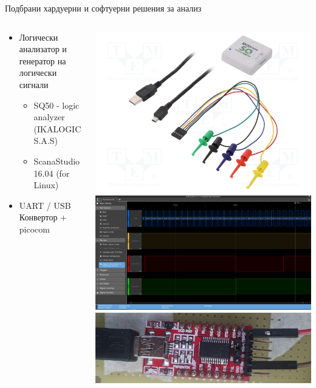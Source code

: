\documentclass{beamer}
\begin{document}
\begin{frame}{Подбрани хардуерни и софтуерни решения за анализ}
	\begin{columns}
		\pause
		\begin{block}{ }
			\begin{itemize}
				\pause
				\item Логически анализатор и генератор на логически сигнали
					\begin{itemize}
						\pause
						\item SQ50 - logic analyzer (IKALOGIC S.A.S)
						\pause
						\item ScanaStudio 16.04 (for Linux)
					\end{itemize}
				\pause
				\item UART / USB Конвертор + picocom
			\end{itemize}
		\end{block}
		\pause
		\includegraphics[width=0.8\linewidth]{Images/SQ50-logic-analyzer.png} \\[0.5em]
		\includegraphics[width=0.8\linewidth]{Images/scana_studio_window.png}\\[0.5em]	
		\includegraphics[width=0.9\linewidth]{Images/uart_usb.png} \\[0.5em]
	\end{columns}
\end{frame}
\end{document}
